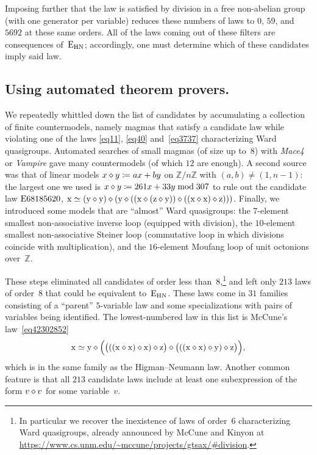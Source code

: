 Imposing further that the law is satisfied by division in a free non-abelian group (with one generator per variable) reduces these numbers of laws to $0$, $59$, and $\num{5692}$ at these same orders.  All of the laws coming out of these filters are consequences of~$\mathrm{E}_{\mathrm{HN}}$; accordingly, one must determine which of these candidates imply said law.

\subsection{Using automated theorem provers.}

We repeatedly whittled down the list of candidates by accumulating a collection of finite countermodels, namely magmas that satisfy a candidate law while violating one of the laws \eqref{eq11}, \eqref{eq40} and~\eqref{eq3737} characterizing Ward quasigroups.  Automated searches of small magmas (of size up to~$8$) with \emph{Mace4} or \emph{Vampire} gave many countermodels (of which $12$ are enough).  A second source was that of linear models $x \diamond y \coloneqq ax+by$ on $\mathbb{Z}/n\mathbb{Z}$ with $(a,b)\neq(1,n-1)$: the largest one we used is $x \diamond y \coloneqq 261x + 33y \bmod 307$ to rule out the candidate law $\mathrm{E}68185620$, $\mathrm{x} \simeq (\mathrm{y} \diamond \mathrm{y}) \diamond (\mathrm{y} \diamond ((\mathrm{x} \diamond (\mathrm{z} \diamond \mathrm{y})) \diamond ((\mathrm{x} \diamond \mathrm{x}) \diamond \mathrm{z})))$.  Finally, we introduced some models that are ``almost'' Ward quasigroups: the $7$-element smallest non-associative inverse loop (equipped with division), the $10$-element smallest non-associative Steiner loop (commutative loop in which divisions coincide with multiplication), and the $16$-element Moufang loop of unit octonions over~$\mathbb{Z}$.

These steps eliminated all candidates of order less than~$8$,\footnote{In particular we recover the inexistence of laws of order~$6$ characterizing Ward quasigroups, already announced by McCune and Kinyon at \url{https://www.cs.unm.edu/~mccune/projects/gtsax/\#division}.} and left only $213$ laws of order~$8$ that could be equivalent to~$\mathrm{E}_{\mathrm{HN}}$.  These laws come in $31$ families consisting of a ``parent'' $5$-variable law and some specializations with pairs of variables being identified.  The lowest-numbered law in this list is McCune's law~\eqref{eq42302852}
\[
\mathrm{x} \simeq \mathrm{y} \diamond \Bigl(\bigl(((\mathrm{x} \diamond \mathrm{x}) \diamond \mathrm{x}) \diamond \mathrm{z}\bigr) \diamond \bigl(((\mathrm{x} \diamond \mathrm{x}) \diamond \mathrm{y}) \diamond \mathrm{z}\bigr)\Bigr) ,
\]
which is in the same family as the Higman--Neumann law.  Another common feature is that all $213$ candidate laws include at least one subexpression of the form $v \diamond v$ for some variable~$v$.

